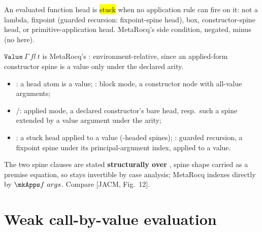\begin{definition}
\label{def:isStuckApp}
\leanok
{}
 An evaluated function head is \hl{stuck} when no application rule can fire on it: not a lambda, fixpoint (guarded recursion: fixpoint-spine head), box, constructor-spine head, or primitive-application head.
 MetaRocq's  side condition, negated, minus  (no  here).
\end{definition}

\begin{definition}
\label{def:Value}
\leanok
{}
 $\mathtt{Value}\ \Gamma\ fl\ t$ is MetaRocq's : environment-relative, since an applied-form constructor spine is a value only under the declared arity.
\begin{itemize}
\item {}: a head atom is a value; : block mode, a constructor node with all-value arguments;
\item {}/: applied mode, a declared constructor's bare head, resp.\ such a spine extended by a value argument under the arity;
\item {}: a stuck head applied to a value (-headed spines); : guarded recursion, a fixpoint spine under its principal-argument index, applied to a value.
\end{itemize}
\end{definition}

\begin{remark}
 The two spine clauses are stated \textbf{structurally over }, spine shape carried as a premise equation, so  stays invertible by case analysis; MetaRocq indexes directly by $\mkApps f\ args$. Compare [JACM, Fig.~12].
\end{remark}

\section{Weak call-by-value evaluation}
\label{sec:lambdabox:eval}

